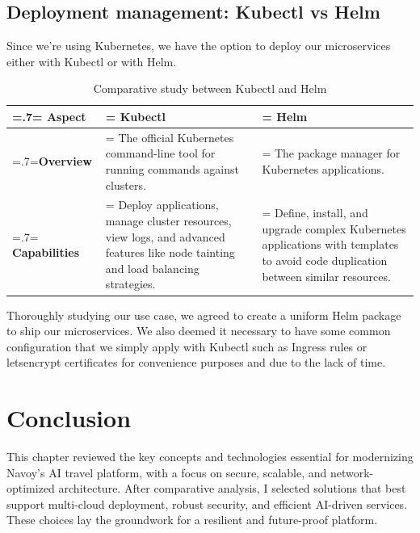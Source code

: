 \subsection{Deployment management: Kubectl vs Helm}
Since we're using Kubernetes, we have the option to deploy our microservices either with Kubectl or with Helm.
\begin{table}[H]
    \renewcommand{\arraystretch}{1.5}%
    \caption{Comparative study between Kubectl and Helm}
    \centering
    \medskip
    \begin{tabularx}{1\textwidth} {
            | >{\hsize=.7\hsize\linewidth=\hsize\centering\arraybackslash}X
            | >{\hsize=1.15\hsize\linewidth=\hsize\justifying\arraybackslash}X
            | >{\hsize=1.15\hsize\linewidth=\hsize\justifying\arraybackslash}X |}
        \hline
        \rowcolor{primary} \textbf {Aspect} & \textbf{Kubectl}                                                                                                                            & \textbf{Helm}                                                                                                                              \\
        \hline
        \textbf {Overview}                  & \noindent The official Kubernetes command-line tool for running commands against clusters.                                                  & \noindent The package manager for Kubernetes applications.                                                                                 \\
        \hline
        \textbf {Capabilities}              & \noindent Deploy applications, manage cluster resources, view logs, and advanced features like node tainting and load balancing strategies. & \noindent Define, install, and upgrade complex Kubernetes applications with templates to avoid code duplication between similar resources. \\
        \hline
    \end{tabularx}
\end{table}
Thoroughly studying our use case, we agreed to create a uniform Helm package to ship our microservices.
We also deemed it necessary to have some common configuration that we simply apply with Kubectl such as Ingress rules or letsencrypt certificates for convenience purposes and due to the lack of time.

\setcounter{secnumdepth}{0} %
\section{Conclusion}
This chapter reviewed the key concepts and technologies essential for modernizing Navoy's AI travel platform, with a focus on secure, scalable, and network-optimized architecture. After comparative analysis, I selected solutions that best support multi-cloud deployment, robust security, and efficient AI-driven services. These choices lay the groundwork for a resilient and future-proof platform.
